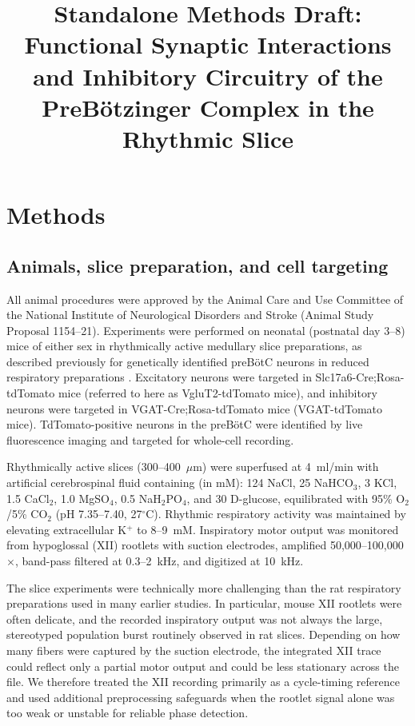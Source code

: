 \documentclass[11pt]{article}
\title{Standalone Methods Draft:\\Functional Synaptic Interactions and Inhibitory Circuitry of the PreB\"otzinger Complex in the Rhythmic Slice}
\author{}
\date{}
\begin{document}
\maketitle

\section{Methods}

\subsection{Animals, slice preparation, and cell targeting}
All animal procedures were approved by the Animal Care and Use Committee of the National Institute of Neurological Disorders and Stroke (Animal Study Proposal 1154--21). Experiments were performed on neonatal (postnatal day 3--8) mice of either sex in rhythmically active medullary slice preparations, as described previously for genetically identified preB\"otC neurons in reduced respiratory preparations \citep{koizumi2013structural,ausborn2018organization}. Excitatory neurons were targeted in Slc17a6-Cre;Rosa-tdTomato mice (referred to here as VgluT2-tdTomato mice), and inhibitory neurons were targeted in VGAT-Cre;Rosa-tdTomato mice (VGAT-tdTomato mice). TdTomato-positive neurons in the preB\"otC were identified by live fluorescence imaging and targeted for whole-cell recording.

Rhythmically active slices (300--400~$\mu$m) were superfused at 4~ml/min with artificial cerebrospinal fluid containing (in mM): 124 NaCl, 25 NaHCO$_3$, 3 KCl, 1.5 CaCl$_2$, 1.0 MgSO$_4$, 0.5 NaH$_2$PO$_4$, and 30 D-glucose, equilibrated with 95\% O$_2$/5\% CO$_2$ (pH 7.35--7.40, 27$^\circ$C). Rhythmic respiratory activity was maintained by elevating extracellular K$^+$ to 8--9~mM. Inspiratory motor output was monitored from hypoglossal (XII) rootlets with suction electrodes, amplified 50{,}000--100{,}000$\times$, band-pass filtered at 0.3--2~kHz, and digitized at 10~kHz.

The slice experiments were technically more challenging than the rat respiratory preparations used in many earlier studies. In particular, mouse XII rootlets were often delicate, and the recorded inspiratory output was not always the large, stereotyped population burst routinely observed in rat slices. Depending on how many fibers were captured by the suction electrode, the integrated XII trace could reflect only a partial motor output and could be less stationary across the file. We therefore treated the XII recording primarily as a cycle-timing reference and used additional preprocessing safeguards when the rootlet signal alone was too weak or unstable for reliable phase detection.
\end{document}
